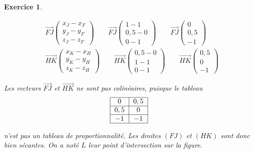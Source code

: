 \documentclass[10pt]{article}
\newtheorem{exo}{Exercice}
\begin{document}
\begin{exo}
\begin{multicols}{2}
\begin{enumerate}
\begin{align*}&\overrightarrow{FJ}\begin{pmatrix} x_J-x_F\\y_J-y_F\\z_J-z_F \end{pmatrix}\qquad 
\overrightarrow{FJ}\begin{pmatrix} 1-1\\0,5-0\\0-1\end{pmatrix}\qquad \overrightarrow{FJ}\begin{pmatrix} 0
\\0,5\\-1 \end{pmatrix}\\
&\overrightarrow{HK}\begin{pmatrix} x_K-x_H\\y_K-y_H\\z_K-z_H \end{pmatrix}\qquad 
\overrightarrow{HK}\begin{pmatrix} 0,5-0\\1-1\\0-1\end{pmatrix}\qquad \overrightarrow{HK}\begin{pmatrix} 0,5
\\0\\-1 \end{pmatrix}
\end{align*}


\medskip

Les vecteurs $\overrightarrow{FJ}$ et $\overrightarrow{HK}$ ne sont pas colinéaires, puisque le tableau \[\begin{tabular}{|c|c|}\hline
   $0$ & $0,5$  \\ \hline
   $0,5$ & $0$  \\ \hline
   $-1$ & $-1$  \\ \hline
   \end{tabular}\]
   
   n'est pas un tableau de proportionnalité. Les droites $(FJ)$ et $(HK)$ sont donc bien sécantes. On a noté $L$ leur point d'intersection sur la figure.

\end{enumerate}

\end{multicols}
\end{exo}
\end{document}
